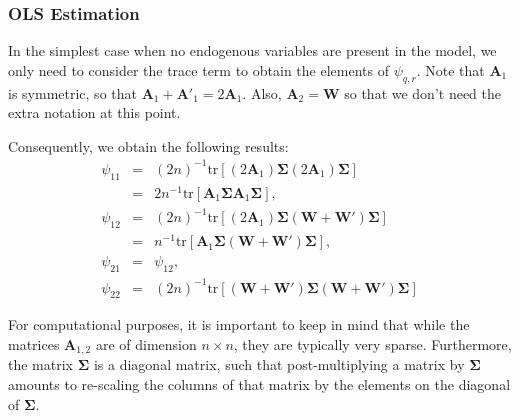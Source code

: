 \documentclass{article}
\begin{document}
\subsubsection{OLS Estimation}\label{sss:phiols}
In the simplest case when no endogenous variables are present in the model, we
only need to consider the trace term to obtain the elements of $\psi_{q,r}$. Note that 
$\mathbf{A}_1$ is symmetric, so that $\mathbf{A}_1 + \mathbf{A'}_1 = 2 \mathbf{A}_1$.
Also, $\mathbf{A}_2 = \mathbf{W}$ so that we don't need the extra notation at this
point.

Consequently, we obtain the following results:
\begin{eqnarray*}
 \psi_{11} &=& (2n)^{-1} \mbox{tr} [ (2 \mathbf{A}_1 ) \mathbf{\Sigma}  (2 \mathbf{A}_1 ) \mathbf{\Sigma} ]\\
        &=&  2 n^{-1} \mbox{tr} [ \mathbf{A}_1 \mathbf{\Sigma} \mathbf{A}_1 \mathbf{\Sigma} ],\\
  \psi_{12} &=& (2n)^{-1} \mbox{tr} [ (2 \mathbf{A}_1 ) \mathbf{\Sigma} (\mathbf{W} + \mathbf{W'} ) \mathbf{\Sigma} ]\\
       &=& n^{-1} \mbox{tr} [  \mathbf{A}_1 \mathbf{\Sigma} (\mathbf{W} + \mathbf{W'} ) \mathbf{\Sigma} ],\\
   \psi_{21} &=& \psi_{12},\\
   \psi_{22} &=& (2n)^{-1} \mbox{tr} [ (\mathbf{W} + \mathbf{W'}) \mathbf{\Sigma} 
   (\mathbf{W} + \mathbf{W'})\mathbf{\Sigma} ]
\end{eqnarray*}

For computational purposes, it is important to keep in mind that while the matrices
$\mathbf{A}_{1,2}$ are of dimension $n \times n$, they are typically very sparse.
Furthermore, the matrix $\mathbf{\Sigma}$ is a diagonal matrix, such that post-multiplying a matrix by
$\mathbf{\Sigma}$ amounts to re-scaling the columns of that matrix by the elements on the diagonal
of $\mathbf{\Sigma}$.
\end{document}
